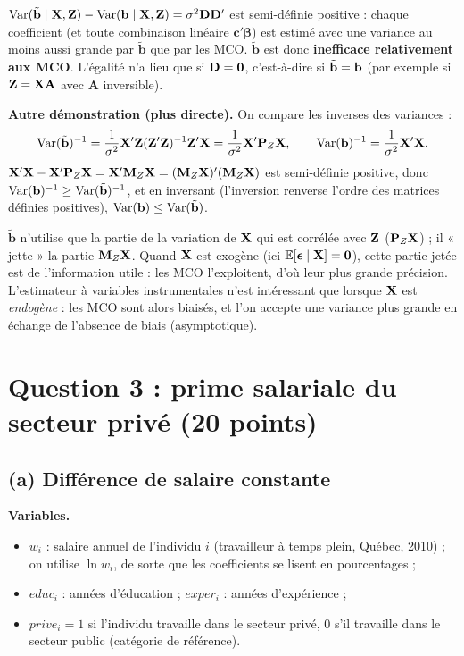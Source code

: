 \documentclass[11pt,a4paper]{article}
\newcommand{\vbeta}{\bm{\beta}}\newcommand{\veps}{\bm{\epsilon}}\newcommand{\vi}{\bm{\iota}}
\newcommand{\A}{\mathbf{A}}\newcommand{\Pm}{\mathbf{P}}\newcommand{\Mm}{\mathbf{M}}
\newcommand{\tb}{\tilde{\mathbf{b}}}
\newcommand{\E}{\mathbb{E}}\newcommand{\Var}{\operatorname{Var}}\newcommand{\Cov}{\operatorname{Cov}}
\begin{document}
\begin{reponse}
$\Var(\tb\mid\vX,\vZ)-\Var(\vb\mid\vX,\vZ)=\sigma^2\D\D'$ est semi-définie positive : chaque coefficient (et toute combinaison linéaire $\mathbf c'\vbeta$) est estimé avec une variance au moins aussi grande par $\tb$ que par les MCO. $\tb$ est donc \textbf{inefficace relativement aux MCO}. L'égalité n'a lieu que si $\mathbf{D}=\mathbf 0$, c'est-à-dire si $\tb=\vb$ (par exemple si $\vZ=\vX\A$ avec $\A$ inversible).
\end{reponse}

\textbf{Autre démonstration (plus directe).} On compare les inverses des variances :
\[
\Var(\tb)^{-1}=\frac1{\sigma^2}\vX'\vZ(\vZ'\vZ)^{-1}\vZ'\vX=\frac1{\sigma^2}\vX'\Pm_Z\vX,
\qquad
\Var(\vb)^{-1}=\frac1{\sigma^2}\vX'\vX .
\]
$\vX'\vX-\vX'\Pm_Z\vX=\vX'\Mm_Z\vX=(\Mm_Z\vX)'(\Mm_Z\vX)$ est semi-définie positive, donc $\Var(\vb)^{-1}\ge\Var(\tb)^{-1}$, et en inversant (l'inversion renverse l'ordre des matrices définies positives), $\Var(\vb)\le\Var(\tb)$.

\begin{intuition}
$\tb$ n'utilise que la partie de la variation de $\mathbf{X}$ qui est corrélée avec $\mathbf{Z}$ ($\Pm_Z\vX$) ; il « jette » la partie $\Mm_Z\vX$. Quand $\mathbf{X}$ est exogène (ici $\E[\veps\mid\vX]=\mathbf 0$), cette partie jetée est de l'information utile : les MCO l'exploitent, d'où leur plus grande précision. L'estimateur à variables instrumentales n'est intéressant que lorsque $\mathbf{X}$ est \emph{endogène} : les MCO sont alors biaisés, et l'on accepte une variance plus grande en échange de l'absence de biais (asymptotique).
\end{intuition}

\section{Question 3 : prime salariale du secteur privé (20 points)}

\subsection*{(a) Différence de salaire constante}

\textbf{Variables.}
\begin{itemize}[nosep]
\item $w_i$ : salaire annuel de l'individu $i$ (travailleur à temps plein, Québec, 2010) ; on utilise $\ln w_i$, de sorte que les coefficients se lisent en pourcentages ;
\item $educ_i$ : années d'éducation ; $exper_i$ : années d'expérience ;
\item $prive_i=1$ si l'individu travaille dans le secteur privé, 0 s'il travaille dans le secteur public (catégorie de référence).
\end{itemize}
\end{document}
